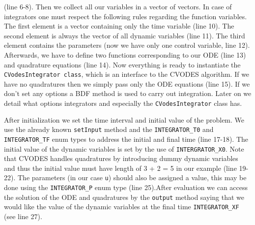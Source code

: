 \documentclass[a4paper,12pt]{book}
\begin{document}
{(line 6-8). Then we collect all our variables in a vector of vectors. In case of integrators one must respect the following rules regarding the
function variables. The first element
is a vector containing only the time variable (line 10). The second element is always the vector of all dynamic variables (line 11).
The third element contains the parameters (now we have only one control variable, line 12). Afterwards, we have to define two functions corresponding
to our ODE (line 13) and quadrature equations (line 14). Now everything is ready to instantiate the \texttt{CVodesIntegrator class}, which is an interface
to the CVODES algorithm. If we have no quadratures then we simply pass only the ODE equations (line 15). If we don't set any options a BDF method is used
to carry out integration. Later on we detail what options integrators and especially the \texttt{CVodesIntegrator} class has.
\par After initialization we set the time interval and initial value of the problem. We use the already known \texttt{setInput} method and the
\texttt{INTEGRATOR\_T0} and \texttt{INTEGRATOR\_TF} enum types to address the initial and final time (line 17-18). The initial value of the dynamic
variables is set by the use of \texttt{INTERGRATOR\_X0}. Note that CVODES handles quadratures by introducing dummy dynamic variables and thus the initial
value must have length of 3 + 2 = 5 in our example (line 19-22). The parameters (in our case \texttt{u}) should also be assigned a value, this may be done
using the \texttt{INTEGRATOR\_P} enum type (line 25).After evaluation we can access the solution of the ODE and quadratures by the \texttt{output} method
saying that we would like the value of the dynamic variables at the final time \texttt{INTEGRATOR\_XF} (see line 27).
}
\end{document}
